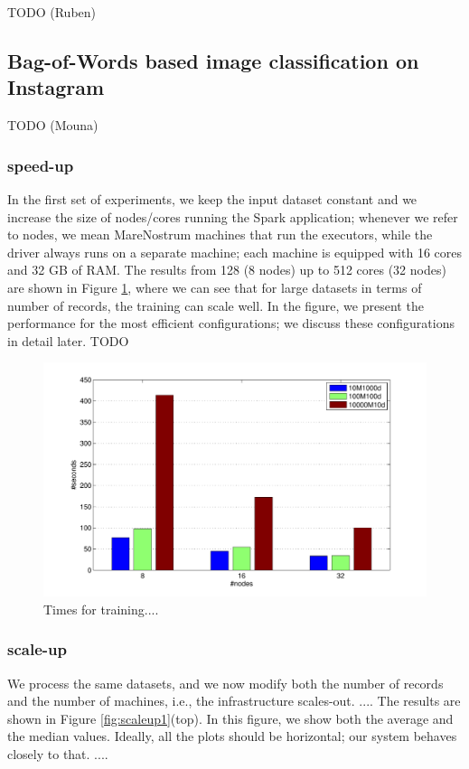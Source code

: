 \documentclass[journal]{IEEEtran}
\begin{document}
TODO (Ruben)

\subsection{Bag-of-Words based image classification on Instagram}

TODO (Mouna)

\subsubsection{speed-up} In the first set of experiments, we keep the input dataset constant and we increase the size of nodes/cores running the Spark application; whenever we refer to nodes, we mean  MareNostrum machines that run the executors, while the driver always runs on a separate machine; each machine is equipped with 16 cores and 32 GB of RAM. The results from 128 (8 nodes) up to 512 cores (32 nodes) are shown in Figure \ref{fig:speedup1}, where we can see that for large datasets in terms of number of records, the training can scale well. In the figure, we present the performance for the most efficient configurations; we discuss these configurations in detail later. TODO

\begin{figure}[tb!]
\begin{center}
\centerline{\includegraphics[width=0.75\linewidth]{img/speedup1.pdf}}
\caption{Times for training....}
\label{fig:speedup1}
\end{center}
\vspace{-0.5cm}
\end{figure}

\subsubsection{scale-up} We process the same datasets, and we now modify both the number of records and the number of machines, i.e., the infrastructure scales-out. .... The results are shown in Figure \ref{fig:scaleup1}(top). In this figure, we show both the average and the median values. Ideally, all the plots should be horizontal; our system behaves closely to that. ....
\end{document}

